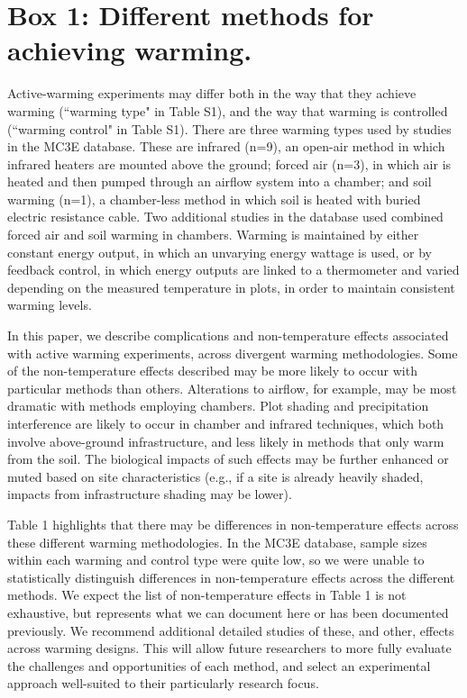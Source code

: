 \documentclass{article}
\begin{document}
\section* {Box 1: Different methods for achieving warming.}
Active-warming experiments may differ both in the way that they achieve warming (``warming type" in Table S1), and the way that warming is controlled (``warming control" in Table S1). There are three warming types used by studies in the MC3E database. These are infrared (n=9), an open-air method in which infrared heaters are mounted above the ground; forced air (n=3), in which air is heated and then pumped through an airflow system into a chamber; and soil warming (n=1), a chamber-less method in which soil is heated with buried electric resistance cable.  Two additional studies in the database used combined forced air and soil warming in chambers. Warming is maintained by either constant energy output, in which an unvarying energy wattage is used, or by feedback control, in which energy outputs are linked to a thermometer and varied depending on the measured temperature in plots, in order to maintain consistent warming levels. 
\par In this paper, we describe complications and non-temperature effects associated with active warming experiments, across divergent warming methodologies. Some of the non-temperature effects described may be more likely to occur with particular methods than others. Alterations to airflow, for example, may be most dramatic with methods employing chambers. Plot shading and precipitation interference are likely to occur in chamber and infrared techniques, which both involve above-ground infrastructure, and less likely in methods that only warm from the soil. The biological impacts of such effects may be further enhanced or muted based on site characteristics (e.g., if a site is already heavily shaded, impacts from infrastructure shading may be lower).
\par Table 1 highlights that there may be differences in non-temperature effects across these different warming methodologies. In the MC3E database, sample sizes within each warming and control type were quite low, so we were unable to statistically distinguish differences in non-temperature effects across the different methods. We expect the list of non-temperature effects in Table 1 is not exhaustive, but represents what we can document here or has been documented previously. We recommend additional detailed studies of these, and other, effects across warming designs. This will allow future researchers to more fully evaluate the challenges and opportunities of each method, and select an experimental approach well-suited to their particularly research focus.
\end{document}
